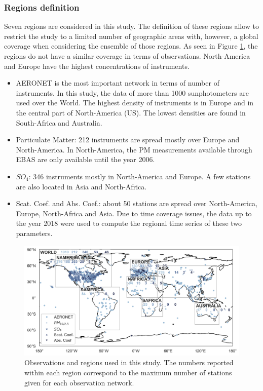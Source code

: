 \documentclass[journal abbreviation, manuscript]{copernicus}
\begin{document}
\subsubsection{Regions definition}
Seven regions are considered in this study. The definition of these regions allow to restrict the study to a limited number of geographic areas with, however, a global coverage when considering the ensemble of those regions. As seen in Figure \ref{fig:map_obs}, the regions do not have a similar coverage in terms of observations. North-America and Europe have the highest concentrations of instruments.
\begin{itemize}
 \item AERONET is the most important network in terms of number of instruments. In this study, the data of more than 1000 sunphotometers are used over the World. The highest density of instruments is in Europe and in the central part of North-America (US). The lowest densities are found in South-Africa and Australia.
 \item Particulate Matter: 212 instruments are spread mostly over Europe and North-America. In North-America, the PM measurements available through EBAS are only available until the year 2006.
 \item $SO_{4}$: 346 instruments mostly in North-America and Europe. A few stations are also located in Asia and North-Africa.
 \item Scat. Coef. and Abs. Coef.: about 50 stations are spread over North-America, Europe, North-Africa and Asia. Due to time coverage issues, the data up to the year 2018 were used to compute the regional time series of these two parameters.
\end{itemize}

\begin{figure}
 \includegraphics[width=12cm]{../scripts/figs/maps/av_obs.png}
 \caption{Observations and regions used in this study. The numbers reported within each region correspond to the maximum number of stations given for each observation network.}
 \label{fig:map_obs}
\end{figure}
\end{document}
